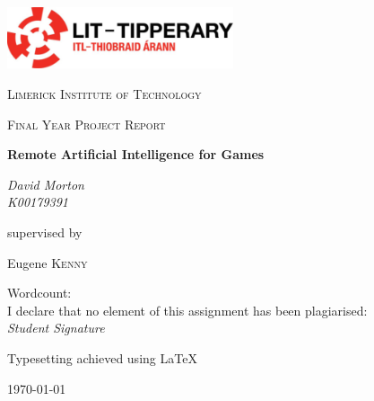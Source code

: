 \documentclass[12pt,a4paper]{report}
\begin{document}
\begin{titlepage}
	\centering
	\includegraphics[width=0.5\textwidth]{Figures/lit_logo.jpg}\par\vspace{1cm}
	{\scshape\LARGE Limerick Institute of Technology \par}
	\vspace{1cm}
	{\scshape\Large Final Year Project Report\par}
	\vspace{1.5cm}
	{\huge\bfseries Remote Artificial Intelligence for Games\par}
	\vspace{2cm}
	{\Large\itshape David Morton\\K00179391\par}
	\vfill
	supervised by\par
	Eugene \textsc{Kenny}

	\vfill

Wordcount:\\
\bigskip
I declare that no element of this assignment has been plagiarised:\\
\textit{Student Signature}

\bigskip
\bigskip

Typesetting achieved using \LaTeX

\bigskip
\bigskip

	{\large \today\par}
\end{titlepage}
\end{document}
